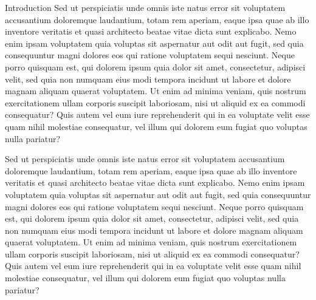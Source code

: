 \documentclass[french, english]{mythesis}
\begin{document}
\begin{mychapter+}{Introduction}
	Sed ut perspiciatis unde omnis iste natus error sit voluptatem accusantium doloremque laudantium, totam rem aperiam, eaque ipsa quae ab illo inventore veritatis et quasi architecto beatae vitae dicta sunt explicabo. Nemo enim ipsam voluptatem quia voluptas sit aspernatur aut odit aut fugit, sed quia consequuntur magni dolores eos qui ratione voluptatem sequi nesciunt. Neque porro quisquam est, qui dolorem ipsum quia dolor sit amet, consectetur, adipisci velit, sed quia non numquam eius modi tempora incidunt ut labore et dolore magnam aliquam quaerat voluptatem. Ut enim ad minima veniam, quis nostrum exercitationem ullam corporis suscipit laboriosam, nisi ut aliquid ex ea commodi consequatur? Quis autem vel eum iure reprehenderit qui in ea voluptate velit esse quam nihil molestiae consequatur, vel illum qui dolorem eum fugiat quo voluptas nulla pariatur?

	Sed ut perspiciatis unde omnis iste natus error sit voluptatem accusantium doloremque laudantium, totam rem aperiam, eaque ipsa quae ab illo inventore veritatis et quasi architecto beatae vitae dicta sunt explicabo. Nemo enim ipsam voluptatem quia voluptas sit aspernatur aut odit aut fugit, sed quia consequuntur magni dolores eos qui ratione voluptatem sequi nesciunt. Neque porro quisquam est, qui dolorem ipsum quia dolor sit amet, consectetur, adipisci velit, sed quia non numquam eius modi tempora incidunt ut labore et dolore magnam aliquam quaerat voluptatem. Ut enim ad minima veniam, quis nostrum exercitationem ullam corporis suscipit laboriosam, nisi ut aliquid ex ea commodi consequatur? Quis autem vel eum iure reprehenderit qui in ea voluptate velit esse quam nihil molestiae consequatur, vel illum qui dolorem eum fugiat quo voluptas nulla pariatur?
	\end{mychapter+}
\end{document}
